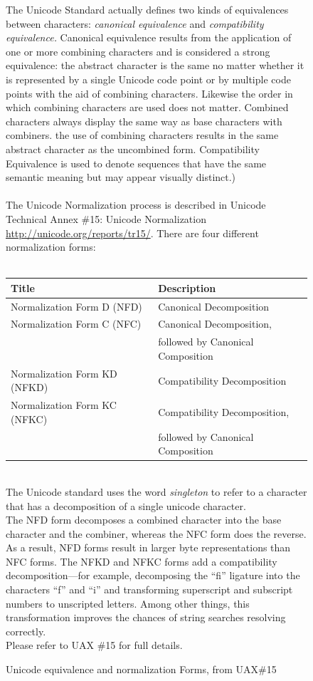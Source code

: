 \begin{figure}[t]

The Unicode Standard actually defines two kinds of equivalences
between characters: \emph{canonical equivalence} and
\emph{compatibility equivalence.} Canonical equivalence results from
the application of one or more combining characters and is considered
a strong equivalence: the abstract character is the same no matter
whether it is represented by a single Unicode code point or by
multiple code points with the aid of combining characters. Likewise
the order in which combining characters are used does not
matter. Combined characters always display the same way as base
characters with combiners. the use of combining characters results in
the same abstract character as the uncombined form. Compatibility
Equivalence is used to denote sequences that have the same semantic
meaning but may appear visually distinct.) \\
~\\
The Unicode Normalization process is described in  Unicode Technical Annex \#15: Unicode Normalization \url{http://unicode.org/reports/tr15/}. There are  four different normalization forms:\\
\\
\begin{centering}
\begin{tabular}{|l|l|}
\hline
Title & Description\\
\hline
Normalization Form D (NFD)	& Canonical Decomposition\\
\hline
Normalization Form C (NFC)	& Canonical Decomposition,\\
                            & followed by Canonical Composition\\
\hline
Normalization Form KD (NFKD) & Compatibility Decomposition\\
\hline
Normalization Form KC (NFKC) & Compatibility Decomposition,\\
                             &followed by Canonical Composition\\
\hline
\end{tabular}
\end{centering}
\\
The Unicode standard uses the word \emph{singleton} to refer to a character that has a decomposition of a single unicode character.
\\
The NFD form decomposes a combined character into the base character and the combiner, whereas the NFC form does the reverse. As a result, NFD forms result in larger byte representations than NFC forms. The NFKD and NFKC forms add a compatibility decomposition---for example, decomposing the ``fi'' ligature into the characters ``f'' and ``i'' and transforming superscript and subscript numbers to unscripted letters. Among other things, this transformation improves the chances of string searches resolving correctly.
\\
Please refer to UAX \#15 for full details.
\caption{Unicode equivalence and normalization Forms, from UAX\#15}\label{unicode-normalization}
\end{figure}

